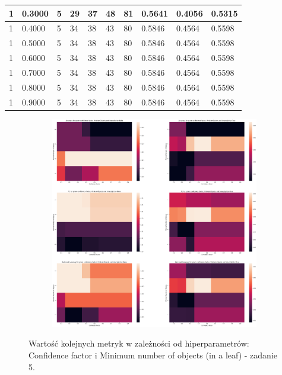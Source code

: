 \documentclass[12pt]{article}
\begin{document}
\begin{table}
{\begin{tabular}{| l | l | l | l | l | l | l | l | l | l |}
			1 & 0.3000 & 5 & 29 & 37 & 48 & 81 & 0.5641 & 0.4056 & 0.5315\\ \hline
			1 & 0.4000 & 5 & 34 & 38 & 43 & 80 & 0.5846 & 0.4564 & 0.5598\\ \hline
			1 & 0.5000 & 5 & 34 & 38 & 43 & 80 & 0.5846 & 0.4564 & 0.5598\\ \hline
			1 & 0.6000 & 5 & 34 & 38 & 43 & 80 & 0.5846 & 0.4564 & 0.5598\\ \hline
			1 & 0.7000 & 5 & 34 & 38 & 43 & 80 & 0.5846 & 0.4564 & 0.5598\\ \hline
			1 & 0.8000 & 5 & 34 & 38 & 43 & 80 & 0.5846 & 0.4564 & 0.5598\\ \hline
			1 & 0.9000 & 5 & 34 & 38 & 43 & 80 & 0.5846 & 0.4564 & 0.5598\\ \hline
		\end{tabular}
	}
\end{table}
\clearpage

\begin{figure}[h!]
	\centering
	\begin{subfigure}[b]{1\linewidth}
		\includegraphics[width=\linewidth]{Train_All.png}
	\end{subfigure}
	\label{fig:Chosen}
	\caption{Wartość kolejnych metryk w zależności od hiperparametrów: Confidence factor i Minimum number of objects (in a leaf) - zadanie 5.}
\end{figure}
\end{document}
